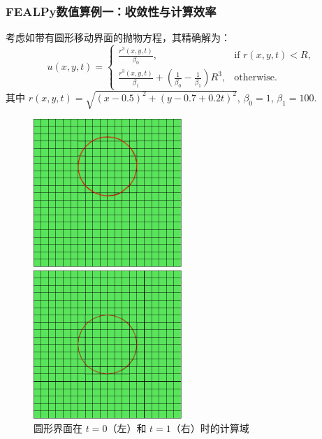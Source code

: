 \documentclass[notheorems,serif]{beamer}
\begin{document}
\begin{frame}
    \frametitle{FEALPy数值算例一：收敛性与计算效率}
考虑如带有圆形移动界面的抛物方程，其精确解为：
\begin{equation}
  u(x,y,t) = \left\{ 
    \begin{matrix}
        \frac{r^3(x, y, t)}{\beta_0}, & \text{if } r(x, y, t) < R,\\
        \frac{r^3(x, y, t)}{\beta_1} + (\frac{1}{\beta_0} - \frac{1}{\beta_1})R^3, & \text{otherwise}.
    \end{matrix}
    \right.
\end{equation}
其中 $r(x, y, t) = \sqrt{(x-0.5)^2 + (y-0.7+0.2t)^2}$, $\beta_0 = 1$, 
$\beta_1 = 100$.

\begin{figure}[H]

    \begin{minipage}[t]{0.49\linewidth}
        \centering
        \includegraphics[width=0.5\textwidth]{../figures/movingmaxwell/circle_interface_0.pdf}
    \end{minipage}
    \begin{minipage}[t]{0.49\linewidth}
        \centering
        \includegraphics[width=0.5\textwidth]{../figures/movingmaxwell/circle_interface_1.pdf}
    \end{minipage}
    \caption{\small 圆形界面在 $t=0$（左）和 $t=1$（右）时的计算域}
\end{figure}
\end{frame}
\end{document}
